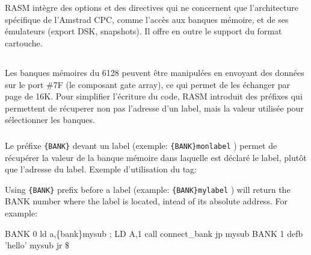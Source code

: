 \section{}

\begin{xfr}
RASM intègre des options et des directives qui ne concernent que l'architecture spécifique de l'Amstrad CPC, comme l'accès aux banques mémoire, et de ses émulateurs (export DSK, snapshots). Il offre en outre le support du format cartouche.
\end{xfr}

\subsection{}

\begin{xfr}
Les banques mémoires du 6128 peuvent être manipulées en envoyant des données sur le port \#7F (le composant gate array), ce qui permet de les échanger par page de 16K. Pour simplifier l'écriture du code, RASM introduit des préfixes qui permettent de récuperer non pas l'adresse d'un label, mais la valeur utilisée pour sélectionner les banques.
\end{xfr}

\subsubsection{}\label{PBANK}

\begin{xfr}
Le préfixe \texttt{\{BANK\}} devant un label (exemple: \texttt{\{BANK\}monlabel} ) permet de récupérer la valeur de la banque mémoire dans laquelle est déclaré le label, plutôt que l'adresse du label.
Exemple d'utilisation du tag:
\end{xfr}

\begin{xen}
Using \texttt{\{BANK\}} prefix before a label (example: \texttt{\{BANK\}mylabel} ) will return the BANK number where the label is located, intead of its absolute address. For example:
\end{xen}

\begin{code}
BANK 0
  ld a,\{bank\}mysub 	; LD A,1
  call connect\_bank
  jp mysub
\medskip
BANK 1
  defb 'hello'
mysub
  jr \$
\end{code}

